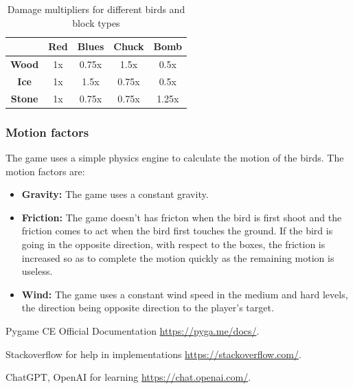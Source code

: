 \documentclass[10pt]{article}
\begin{document}
\begin{table}[h!]
    \centering
    \begin{tabular}{|c|c|c|c|c|}
        \hline
                       & \textbf{Red} & \textbf{Blues} & \textbf{Chuck} & \textbf{Bomb} \\ \hline
        \textbf{Wood}  & 1x           & 0.75x          & 1.5x           & 0.5x          \\ \hline
        \textbf{Ice}   & 1x           & 1.5x           & 0.75x          & 0.5x          \\ \hline
        \textbf{Stone} & 1x           & 0.75x          & 0.75x          & 1.25x         \\ \hline
    \end{tabular}
    \caption{Damage multipliers for different birds and block types}
    \label{tab:damage-multipliers}
\end{table}

\subsubsection{Motion factors}
The game uses a simple physics engine to calculate the motion of the birds. The motion factors are:
\begin{itemize}
    \item \textbf{Gravity:} The game uses a constant gravity.
    \item \textbf{Friction:} The game doesn't has fricton when the bird is first shoot and the friction comes to act when the bird first touches the ground. 
    If the bird is going in the opposite direction, with respect to the boxes, the friction is increased so as to complete the motion quickly as the remaining motion is useless.
    \item \textbf{Wind:} The game uses a constant wind speed in the medium and hard levels, the direction being opposite direction to the player's target.
\end{itemize}

\vspace{2cm}

\label{sec:References}
\begin{thebibliography}{9}
    Pygame CE Official Documentation \url{https://pyga.me/docs/}.

    Stackoverflow for help in implementations \url{https://stackoverflow.com/}.

    ChatGPT, OpenAI for learning \url{https://chat.openai.com/}.

\end{thebibliography}
\end{document}
